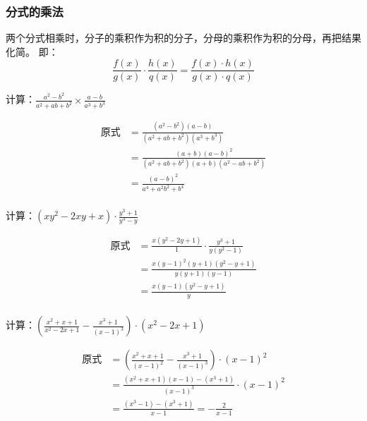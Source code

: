 \subsubsection{分式的乘法}

两个分式相乘时，分子的乘积作为积的分子，分母的乘积作为积的分母，再把结果化简。
即：
\[\frac{f(x)}{g(x)}\cdot \frac{h(x)}{q(x)}=\frac{f(x)\cdot h(x)}{g(x)\cdot q(x)} \]


\begin{example}
    计算：$\frac{a^{2}-b^{2}}{a^{2}+a b+b^{2}} \times \frac{a-b}{a^{3}+b^{3}}$
\end{example}


\begin{solution}
    \[\begin{split}
    \text{原式}&=\frac{\left(a^{2}-b^{2}\right)(a-b)}{\left(a^{2}+a b+b^{2}\right)\left(a^{3}+b^{3}\right)}   \\
    &=\frac{(a+b)(a-b)^{2}}{\left(a^{2}+a b+b^{2}\right)(a+b)\left(a^{2}-a b+b^{2}\right)}\\
    &=\frac{(a-b)^{2}}{a^{4}+a^{2} b^{2}+b^{4}}\\
\end{split}\]
\end{solution}

\begin{example}
    计算：$\left(x y^{2}-2 x y+x\right) \cdot \frac{y^{3}+1}{y^{3}-y}$
\end{example}

\begin{solution}
\[\begin{split}
    \text{原式}&=\frac{x(y^2-2y+1)}{1}\cdot \frac{y^3+1}{y(y^2-1)}   \\
    &= \frac{x(y-1)^2 (y+1)(y^2-y+1)}{y(y+1)(y-1)}  \\
    &= \frac{x(y-1)(y^2-y+1)}{y}         \\
\end{split}\]    
    
\end{solution}

\begin{example}
    计算：$\left(\frac{x^{2}+x+1}{x^{2}-2 x+1}-\frac{x^{3}+1}{(x-1)^{3}}\right)\cdot \left(x^{2}-2 x+1\right)$
\end{example}


\begin{solution}
    \[\begin{split}
        \text{原式}&=\left(\frac{x^{2}+x+1}{(x-1)^2}-\frac{x^{3}+1}{(x-1)^{3}}\right)\cdot (x-1)^2   \\
        &= \frac{(x^2+x+1)(x-1)-(x^3+1)}{(x-1)^3} \cdot (x-1)^2   \\
        &=\frac{(x^3-1)-(x^3+1)}{x-1}=-\frac{2}{x-1}
    \end{split}\]  
\end{solution}

